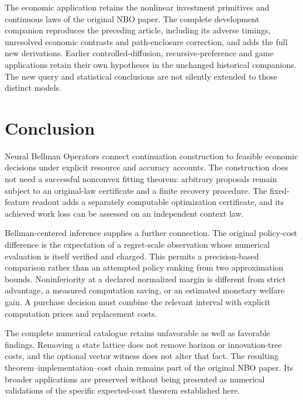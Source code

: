 \documentclass[ecta,nameyear,draft]{econsocart}
\begin{document}
The economic application retains the nonlinear investment primitives and continuous laws of the original NBO paper. The complete development companion reproduces the preceding article, including its adverse timings, unresolved economic contrasts and path-enclosure correction, and adds the full new derivations. Earlier controlled-diffusion, recursive-preference and game applications retain their own hypotheses in the unchanged historical companions. The new query and statistical conclusions are not silently extended to those distinct models.













\section{Conclusion}\label{sec:conclusion67}
Neural Bellman Operators connect continuation construction to feasible economic decisions under explicit resource and accuracy accounts. The construction does not need a successful nonconvex fitting theorem: arbitrary proposals remain subject to an original-law certificate and a finite recovery procedure. The fixed-feature readout adds a separately computable optimization certificate, and its achieved work loss can be assessed on an independent context law.

Bellman-centered inference supplies a further connection. The original policy-cost difference is the expectation of a regret-scale observation whose numerical evaluation is itself verified and charged. This permits a precision-based comparison rather than an attempted policy ranking from two approximation bounds. Noninferiority at a declared normalized margin is different from strict advantage, a measured computation saving, or an estimated monetary welfare gain. A purchase decision must combine the relevant interval with explicit computation prices and replacement costs.

The complete numerical catalogue retains unfavorable as well as favorable findings. Removing a state lattice does not remove horizon or innovation-tree costs, and the optional vector witness does not alter that fact. The resulting theorem--implementation--cost chain remains part of the original NBO paper. Its broader applications are preserved without being presented as numerical validations of the specific expected-cost theorem established here.



\end{document}
